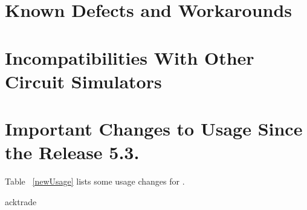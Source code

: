 \documentclass[11pt,report,strict]{SANDreport}
\begin{document}
\newpage

\section{Known Defects and Workarounds}
\newpage

\section{Incompatibilities With Other Circuit Simulators}

\newpage
\section{Important Changes to \Xyce{} Usage Since the Release 5.3.}
Table ~\ref{newUsage} lists some usage changes for \Xyce{}.

\clearpage
\LTXtable{\textwidth} {acktrade}
\begin{SANDdistribution}[NM]%

    \bigskip



\end{SANDdistribution}
\end{document}
